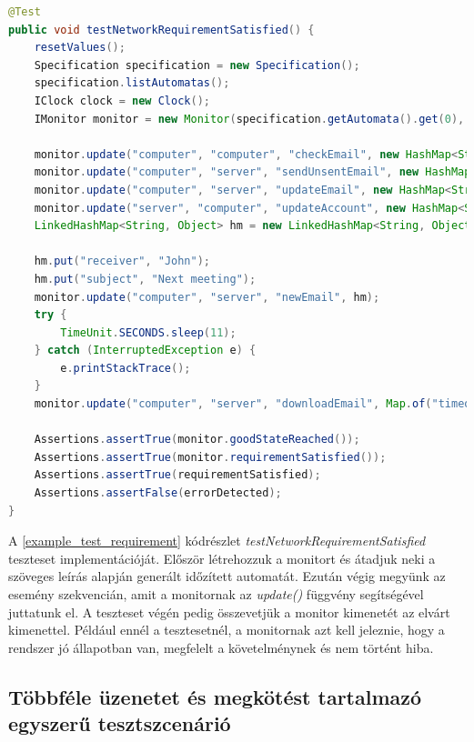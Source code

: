 \begin{lstlisting}[language=java, frame=single, float=ht!, caption={\textit{testNetworkRequirementSatisfied} teszteset.},captionpos=b,label=example_test_requirement]
@Test
public void testNetworkRequirementSatisfied() {
    resetValues();
    Specification specification = new Specification();
    specification.listAutomatas();
    IClock clock = new Clock();
    IMonitor monitor = new Monitor(specification.getAutomata().get(0), clock, this);
    
    monitor.update("computer", "computer", "checkEmail", new HashMap<String, Object>());
    monitor.update("computer", "server", "sendUnsentEmail", new HashMap<String, Object>());
    monitor.update("computer", "server", "updateEmail", new HashMap<String, Object>());
    monitor.update("server", "computer", "updateAccount", new HashMap<String, Object>());
    LinkedHashMap<String, Object> hm = new LinkedHashMap<String, Object>();

    hm.put("receiver", "John");
    hm.put("subject", "Next meeting");
    monitor.update("computer", "server", "newEmail", hm);
    try {
        TimeUnit.SECONDS.sleep(11);
    } catch (InterruptedException e) {
        e.printStackTrace();
    }
    monitor.update("computer", "server", "downloadEmail", Map.of("timeout", 10));
    
    Assertions.assertTrue(monitor.goodStateReached());
    Assertions.assertTrue(monitor.requirementSatisfied());
    Assertions.assertTrue(requirementSatisfied);
    Assertions.assertFalse(errorDetected);
}
\end{lstlisting}

A \ref{example_test_requirement} kódrészlet \textit{testNetworkRequirementSatisfied} teszteset implementációját.
Először létrehozzuk a monitort és átadjuk neki a szöveges leírás alapján generált időzített automatát.
Ezután végig megyünk az esemény szekvencián, amit a monitornak az \textit{update()} függvény segítségével juttatunk el.
A teszteset végén pedig összevetjük a monitor kimenetét az elvárt kimenettel.
Például ennél a tesztesetnél, a monitornak azt kell jeleznie, hogy a rendszer jó állapotban van, megfelelt a követelménynek és nem történt hiba.

\subsection{Többféle üzenetet és megkötést tartalmazó egyszerű tesztszcenárió}

